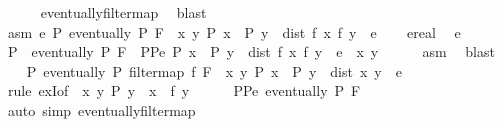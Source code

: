 \begin{isabellebody}
\ \ \ \ \isamarkupfalse%
\ eventually{\isacharunderscore}{\kern0pt}filtermap\ \isamarkupfalse%
\ blast\isanewline
{}\isamarkupfalse%
\isanewline
\ \ \isamarkupfalse%
\ asm{\isacharcolon}{\kern0pt}\ {\isacartoucheopen}{\isasymforall}e{\isachargreater}{\kern0pt}{}{\isachardot}{\kern0pt}\ {\isasymexists}P{\isachardot}{\kern0pt}\ eventually\ P\ F\ {\isasymand}\ {\isacharparenleft}{\kern0pt}{\isasymforall}x\ y{\isachardot}{\kern0pt}\ P\ x\ {\isasymand}\ P\ y\ {\isasymlongrightarrow}\ dist\ {\isacharparenleft}{\kern0pt}f\ x{\isacharparenright}{\kern0pt}\ {\isacharparenleft}{\kern0pt}f\ y{\isacharparenright}{\kern0pt}\ {\isacharless}{\kern0pt}\ e{\isacharparenright}{\kern0pt}{\isacartoucheclose}\isanewline
\ \ \isamarkupfalse%
\ e{\isacharcolon}{\kern0pt}{\isacharcolon}{\kern0pt}real\ \isamarkupfalse%
\ {\isacartoucheopen}e\ {\isachargreater}{\kern0pt}\ {}{\isacartoucheclose}\isanewline
\ \ \isamarkupfalse%
\ \isamarkupfalse%
\ P\ \ {\isacartoucheopen}eventually\ P\ F{\isacartoucheclose}\ \ PPe{\isacharcolon}{\kern0pt}\ {\isacartoucheopen}P\ x\ {\isasymand}\ P\ y\ {\isasymlongrightarrow}\ dist\ {\isacharparenleft}{\kern0pt}f\ x{\isacharparenright}{\kern0pt}\ {\isacharparenleft}{\kern0pt}f\ y{\isacharparenright}{\kern0pt}\ {\isacharless}{\kern0pt}\ e{\isacartoucheclose}\ \ x\ y\isanewline
\ \ \ \ \isamarkupfalse%
\ asm\ \isamarkupfalse%
\ blast\isanewline
\isanewline
\ \ \isamarkupfalse%
\ {\isacartoucheopen}{\isasymexists}P{\isachardot}{\kern0pt}\ eventually\ P\ {\isacharparenleft}{\kern0pt}filtermap\ f\ F{\isacharparenright}{\kern0pt}\ {\isasymand}\ {\isacharparenleft}{\kern0pt}{\isasymforall}x\ y{\isachardot}{\kern0pt}\ P\ x\ {\isasymand}\ P\ y\ {\isasymlongrightarrow}\ dist\ x\ y\ {\isacharless}{\kern0pt}\ e{\isacharparenright}{\kern0pt}{\isacartoucheclose}\isanewline
\ \ \ \ \isamarkupfalse%
\ {\isacharparenleft}{\kern0pt}rule\ exI{\isacharbrackleft}{\kern0pt}of\ {\isacharunderscore}{\kern0pt}\ {\isacartoucheopen}{\isasymlambda}x{\isachardot}{\kern0pt}\ {\isasymexists}y{\isachardot}{\kern0pt}\ P\ y\ {\isasymand}\ x\ {\isacharequal}{\kern0pt}\ f\ y{\isacartoucheclose}{\isacharbrackright}{\kern0pt}{\isacharparenright}{\kern0pt}\isanewline
\ \ \ \ \isamarkupfalse%
\ PPe\ {\isacartoucheopen}eventually\ P\ F{\isacartoucheclose}\ \isamarkupfalse%
\ {\isacharparenleft}{\kern0pt}auto\ simp{\isacharcolon}{\kern0pt}\ eventually{\isacharunderscore}{\kern0pt}filtermap{\isacharparenright}{\kern0pt}\isanewline

\end{isabellebody}
